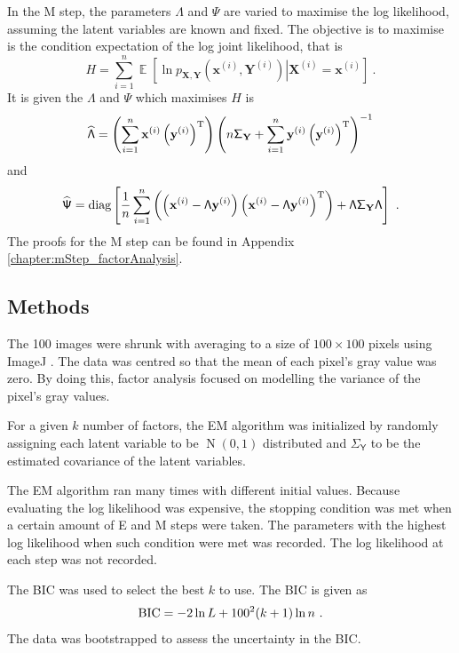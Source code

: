 \documentclass[12pt]{report}
\DeclareMathOperator{\expectation}{\mathbb{E}}
\DeclareMathOperator{\normal}{N}
\newcommand{\T}{^\textup{T}}
\newcommand{\BIC}{\textup{BIC}}
\newcommand{\vect}[1]{\mathbf{#1}}
\newcommand{\matr}[1]{\mathsf{#1}}
\begin{document}
In the M step, the parameters $\matr{\Lambda}$ and $\matr{\Psi}$ are varied to maximise the log likelihood, assuming the latent variables are known and fixed. The objective is to maximise is the condition expectation of the log joint likelihood, that is
\begin{equation}
H = \sum_{i=1}^{n}\expectation\left[\ln p_{\vect{X},\vect{Y}}\left(\vect{x}^{(i)},\vect{Y}^{(i)}\right)
\left|
\vect{X}^{(i)}=\vect{x}^{(i)}\right. \right] \ .
\end{equation}
It is given the $\matr{\Lambda}$ and $\matr{\Psi}$ which maximises $H$ is
\begin{equation}
\widehat{\matr{\Lambda}}
=
\left(\sum_{i=1}^n\vect{x}^{(i)}\left(\vect{y}^{(i)}\right)\T\right)\left(n\matr{\Sigma}_{\vect{Y}}+\sum_{i=1}^{n}\vect{y}^{(i)}\left(\vect{y}^{(i)}\right)\T\right)^{-1}
\end{equation}
and
\begin{equation}
\widehat{\matr{\Psi}} =\text{diag}\left[
\frac{1}{n}\sum_{i=1}^{n}\left(
\left(\vect{x}^{(i)}-\matr{\Lambda}\vect{y}^{(i)}\right)
\left(\vect{x}^{(i)}-\matr{\Lambda}\vect{y}^{(i)}\right)\T
\right)
+\matr{\Lambda}\matr{\Sigma}_{\vect{Y}}\matr{\Lambda}\right]\ .
\end{equation}
The proofs for the M step can be found in Appendix \ref{chapter:mStep_factorAnalysis}.

\subsection{Methods}
The 100 images were shrunk with averaging to a size of $100\times100$ pixels using ImageJ \cite{schindelin2012fiji}. The data was centred so that the mean of each pixel's gray value was zero. By doing this, factor analysis focused on modelling the variance of the pixel's gray values.

For a given $k$ number of factors, the EM algorithm was initialized by randomly assigning each latent variable to be $\normal(0,1)$ distributed and $\matr{\Sigma_Y}$ to be the estimated covariance of the latent variables.

The EM algorithm ran many times with different initial values. Because evaluating the log likelihood was expensive, the stopping condition was met when a certain amount of E and M steps were taken. The parameters with the highest log likelihood when such condition were met was recorded. The log likelihood at each step was not recorded.

The BIC \cite[p.~233]{friedman2009elements} was used to select the best $k$ to use. The BIC is given as
\begin{equation}
\BIC=-2\ln L + 100^2(k+1)\ln n \ .
\end{equation}
The data was bootstrapped \cite{efron1992bootstrap} to assess the uncertainty in the BIC.
\end{document}
